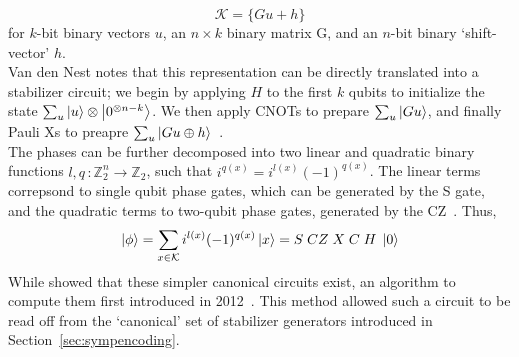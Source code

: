 \begin{equation}
    \mathcal{K}=\{Gu + h\}\label{eq:affinespace}
\end{equation}
for $k$-bit binary vectors $u$, an $n\times k$ binary matrix G, and an $n$-bit binary `shift-vector' $h$.\\
Van den Nest notes that this representation can be directly translated into a stabilizer circuit; we begin by applying $H$ to the first $k$ qubits to initialize the state $\sum_{u}\ket{u}\otimes\ket{0^{\otimes n-k}}$. We then apply CNOTs to prepare $\sum_{u}\ket{Gu}$, and finally Pauli Xs to preapre $\sum_{u}\ket{Gu\oplus h}$~\cite{VandenNest2008}.\\
The phases can be further decomposed into two linear and quadratic binary functions $l,q\,:\mathbb{Z}_{2}^{n}\rightarrow\mathbb{Z}_{2}$, such that $i^{q(x)}=i^{l(x)}(-1)^{q(x)}$. The linear terms correpsond to single qubit phase gates, which can be generated by the S gate, and the quadratic terms to two-qubit phase gates, generated by the CZ~\cite{VandenNest2008}. Thus,
\begin{equation}
\ket{\phi}=\sum_{x\in\mathcal{K}}i^{l(x)}(-1)^{q(x)}\ket{x} = S\;CZ\;X\;C\;H\;\ket{0}
\label{eq:expandedaffinecirc}
\end{equation}
While \cite{VandenNest2008} showed that these simpler canonical circuits exist, an algorithm to compute them first introduced in 2012~\cite{Garcia2012}. This method allowed such a circuit to be read off from the `canonical' set of stabilizer generators introduced in Section~\ref{sec:sympencoding}. 
